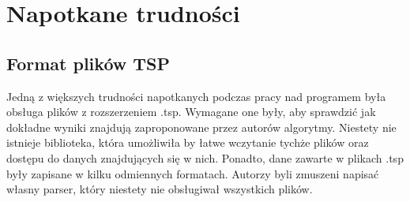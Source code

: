 \section{Napotkane trudności}

\subsection{Format plików TSP}

Jedną z większych trudności napotkanych podczas pracy nad programem 
była obsługa plików z rozszerzeniem .tsp. Wymagane one były, aby sprawdzić
jak dokładne wyniki znajdują zaproponowane przez autorów algorytmy. Niestety
nie istnieje biblioteka, która umożliwiła by łatwe wczytanie tychże plików oraz dostępu
do danych znajdujących się w nich. Ponadto, dane zawarte w plikach .tsp były zapisane 
w kilku odmiennych formatach. Autorzy byli zmuszeni napisać własny
parser, który niestety nie obsługiwał wszystkich plików. 
